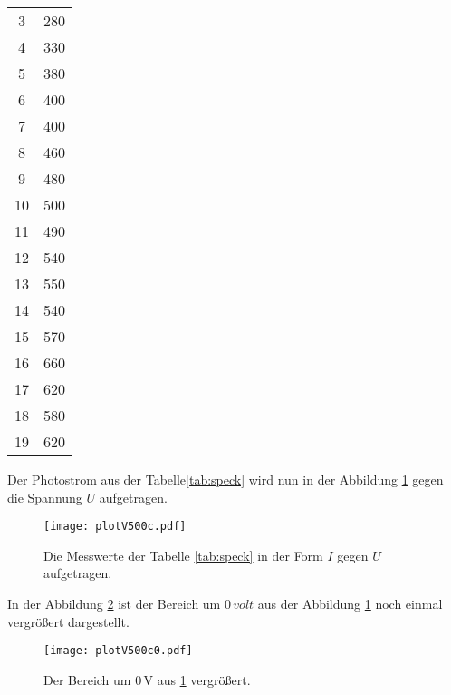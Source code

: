 \begin{center}
\begin{longtable}{c c}
  3   &  280\\
  4   &  330\\
  5   &  380\\
  6   &  400\\
  7   &  400\\
  8   &  460\\
  9   &  480\\
  10  &  500\\
  11  &  490\\
  12  &  540\\
  13  &  550\\
  14  &  540\\
  15  &  570\\
  16  &  660\\
  17  &  620\\
  18  &  580\\
  19  &  620\\
\end{longtable}
\end{center}

Der Photostrom aus der Tabelle\ref{tab:speck} wird nun in der Abbildung \ref{fig:speck} gegen
die Spannung $U$ aufgetragen.


\begin{figure}
 \centering
 \texttt{[image: plotV500c.pdf]}
 \caption{Die Messwerte der Tabelle \ref{tab:speck} in der Form
 $I$ gegen $U$ aufgetragen.}
 \label{fig:speck}
\end{figure}

In der Abbildung \ref{fig:speckzoom} ist der
Bereich um  $0\,\si{volt}$ aus der Abbildung \ref{fig:speck}
noch einmal vergrößert dargestellt.

\begin{figure}
 \centering
 \texttt{[image: plotV500c0.pdf]}
 \caption{Der Bereich um $0\,\si{\volt}$ aus \ref{fig:speck} vergrößert.}
 \label{fig:speckzoom}
\end{figure}
